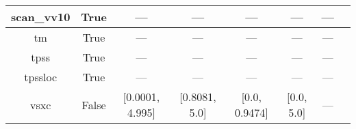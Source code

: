 \begin{tabular}{|c|c|c|c|c|c|c|l|}
    scan\_vv10 &                  True &               --- &               --- &               --- &            --- &         --- &                                                       \cite{Brandenburg2016_115144} \\ \hline
            tm &                  True &               --- &               --- &               --- &            --- &         --- &                                                               \cite{Tao2016_073001} \\ \hline
          tpss &                  True &               --- &               --- &               --- &            --- &         --- &                                               \cite{Tao2003_146401,Perdew2004_6898} \\ \hline
       tpssloc &                  True &               --- &               --- &               --- &            --- &         --- &                                                        \cite{Constantin2012_035130} \\ \hline
          vsxc &                 False &   [0.0001, 4.995] &     [0.8081, 5.0] &     [0.0, 0.9474] &     [0.0, 5.0] &         --- &                                                           \cite{VanVoorhis1998_400} \\ \hline
\end{tabular}